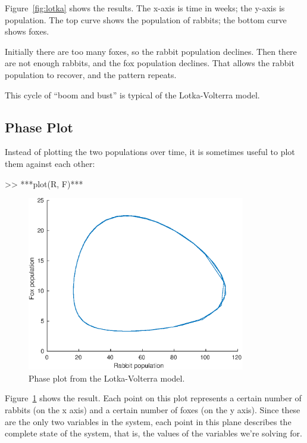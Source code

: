 Figure~\ref{fig:lotka} shows the results. The x-axis is time in weeks; the y-axis is population.  The top curve shows the population of rabbits; the bottom curve shows foxes.


Initially there are too many foxes, so the rabbit population declines.  Then there are not enough rabbits, and the fox population declines.  That allows the rabbit population to recover, and the pattern repeats.

This cycle of ``boom and bust'' is typical of the Lotka-Volterra model.


\subsection{Phase Plot}

Instead of plotting the two populations over time, it is sometimes useful to plot them against each other:

\begin{code}
>> ***plot(R, F)***
\end{code}
\begin{figure}[ht]

\centerline{\includegraphics[height=3in]{book/figs/phase.eps}}
\caption{Phase plot from the Lotka-Volterra model.}
\label{fig:phase}
\end{figure}

Figure~\ref{fig:phase} shows the result.  
Each point on this plot represents a certain number of rabbits (on the
x axis) and a certain number of foxes (on the y axis).
Since these are the only two variables in the system, each point in
this plane describes the complete state of the system, that is, the values of
the variables we're solving for.


